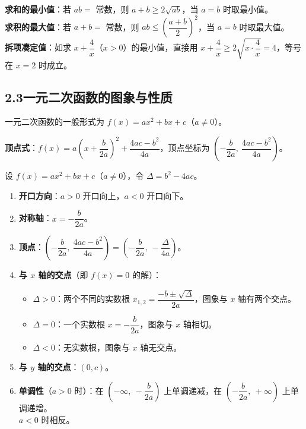 \documentclass[12pt, a4paper]{ctexart}
\begin{document}
\begin{tipbox}[基本不等式的应用技巧]
\textbf{求和的最小值}：若 $ab = $ 常数，则 $a + b \geq 2\sqrt{ab}$，当 $a = b$ 时取最小值。\\
\textbf{求积的最大值}：若 $a + b = $ 常数，则 $ab \leq \left(\dfrac{a+b}{2}\right)^2$，当 $a = b$ 时取最大值。\\
\textbf{拆项凑定值}：如求 $x + \dfrac{4}{x}$（$x > 0$）的最小值，直接用 $x + \dfrac{4}{x} \geq 2\sqrt{x \cdot \dfrac{4}{x}} = 4$，等号在 $x = 2$ 时成立。
\end{tipbox}

\subsection*{2.3\quad 一元二次函数的图象与性质}

\begin{knowledgebox}[一元二次函数]
一元二次函数的一般形式为 $f(x) = ax^2 + bx + c$（$a \neq 0$）。

\textbf{顶点式}：$f(x) = a\left(x + \dfrac{b}{2a}\right)^2 + \dfrac{4ac - b^2}{4a}$，顶点坐标为 $\left(-\dfrac{b}{2a},\ \dfrac{4ac - b^2}{4a}\right)$。
\end{knowledgebox}

\begin{knowledgebox}[一元二次函数的性质]
设 $f(x) = ax^2 + bx + c$（$a \neq 0$），令 $\Delta = b^2 - 4ac$。
\begin{enumerate}[leftmargin=2em]
  \item \textbf{开口方向}：$a > 0$ 开口向上，$a < 0$ 开口向下。
  \item \textbf{对称轴}：$x = -\dfrac{b}{2a}$。
  \item \textbf{顶点}：$\left(-\dfrac{b}{2a},\ \dfrac{4ac - b^2}{4a}\right) = \left(-\dfrac{b}{2a},\ -\dfrac{\Delta}{4a}\right)$。
  \item \textbf{与 $x$ 轴的交点}（即 $f(x) = 0$ 的解）：
    \begin{itemize}
      \item $\Delta > 0$：两个不同的实数根 $x_{1,2} = \dfrac{-b \pm \sqrt{\Delta}}{2a}$，图象与 $x$ 轴有两个交点。
      \item $\Delta = 0$：一个实数根 $x = -\dfrac{b}{2a}$，图象与 $x$ 轴相切。
      \item $\Delta < 0$：无实数根，图象与 $x$ 轴无交点。
    \end{itemize}
  \item \textbf{与 $y$ 轴的交点}：$(0, c)$。
  \item \textbf{单调性}（$a > 0$ 时）：在 $\left(-\infty,\ -\dfrac{b}{2a}\right)$ 上单调递减，在 $\left(-\dfrac{b}{2a},\ +\infty\right)$ 上单调递增。\\
    $a < 0$ 时相反。
\end{enumerate}
\end{knowledgebox}
\end{document}
